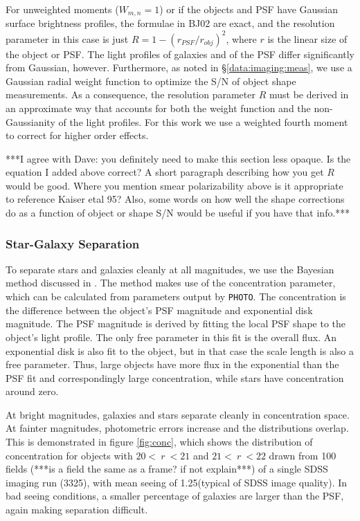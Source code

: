 \documentclass{emulateapj}
\newcommand{\rmag}{$r$}
\newcommand{\photo}{\texttt{PHOTO}}
\begin{document}
For unweighted moments ($W_{m,n}=1$) or if the objects and PSF 
have Gaussian surface brightness profiles, the formulae in BJ02 are
exact, and the resolution parameter in this case is just 
$R=1-(r_{PSF}/r_{obj})^2$, where $r$ is the linear size of the object or PSF.
The light profiles of galaxies and of the PSF differ 
significantly from Gaussian, however.  Furthermore, as noted in 
\S \ref{data:imaging:meas}, we use a Gaussian radial weight
function to optimize the S/N of object shape measurements.  
As a consequence, the resolution
parameter $R$ must be derived in an approximate way that accounts for both the
weight function and the non-Gaussianity of the light profiles.  
For this work we use a weighted fourth 
moment to correct for higher order effects.

***I agree with Dave: you definitely need to make this section less opaque. 
Is the equation I added 
above correct? A short paragraph describing how you get $R$ would be good. Where you 
mention smear polarizability above is it appropriate to reference 
Kaiser etal 95? Also, some words on how well the shape corrections do as 
a function of object or shape S/N would be useful if you have that info.***


\subsubsection{Star-Galaxy Separation} \label{data:imaging:sg}

To separate stars and galaxies cleanly at all magnitudes, we use the Bayesian
method discussed in \cite{Scranton02}.  The method makes use of the
concentration parameter, which can be calculated from parameters output by
\photo.  The concentration is the difference between the object's PSF magnitude
and exponential disk magnitude. The PSF magnitude is derived by fitting the
local PSF shape to the object's light profile. The only free parameter in this
fit is the overall flux. An exponential disk is also fit to the object, but in
that case the scale length is also a free parameter.  Thus, large objects 
have more flux in the exponential than the PSF fit and correspondingly large 
concentration, while stars have concentration around zero.

At bright magnitudes, galaxies and stars separate cleanly in concentration
space. At fainter magnitudes, photometric
errors increase and the distributions overlap. This is demonstrated in
figure \ref{fig:conc}, which shows the distribution of concentration for
objects with $20 <~$\rmag$~< 21$ and $21 <~$\rmag$~< 22$ 
drawn from 100 fields (***is a field the same as a frame? if not explain***)
of a single SDSS imaging run (3325), with mean seeing of 1.25\arcsec (typical 
of SDSS image quality).
In bad seeing conditions, a smaller percentage of galaxies are larger than the
PSF, again making separation difficult. 
\end{document}
